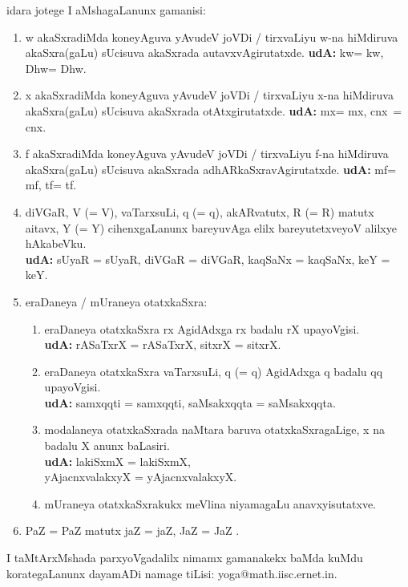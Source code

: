 \documentclass[12pt]{article}
\begin{document}
\bigskip
idara jotege I
aMshagaLanunx gamanisi:
\begin{enumerate}
\renewcommand{\labelenumi}{\theenumi)}
\item 
{\rm w} akaSxradiMda
koneyAguva yAvudeV joVDi / tirxvaLiyu {\rm w}-na hiMdiruva akaSxra(gaLu)
\hbox{sUcisuva} akaSxrada autavxvAgirutatxde. 
{\bf udA:} {\rm kw}= kw, {\rm Dhw}= Dhw.
\item
{\rm x} akaSxradiMda koneyAguva yAvudeV joVDi / tirxvaLiyu {\rm x}-na
hiMdiruva akaSxra(gaLu) sUcisuva akaSxrada otAtxgirutatxde. 
{\bf udA:} {\rm mx}=
\kern3pt\hbox{mx}, {\rm cnx}~=~
\kern3pt\hbox{cnx}. 

\item 
{\rm f} akaSxradiMda
koneyAguva yAvudeV joVDi / tirxvaLiyu {\rm f}-na hiMdiruva akaSxra(gaLu)
sUcisuva akaSxrada adhAR\-kaSxravAgirutatxde. 
{\bf udA:} {\rm mf}= mf, {\rm tf}= tf.
\item
diVGaR, V (= {\rm V}), vaTarxsuLi, \hbox{q} (= {\rm q}),
akARvatutx, R (= {\rm R}) matutx aitavx, \hbox{Y} (= {\rm Y})
cihenxgaLanunx bareyuvAga elilx bareyu\-tetxveyoV alilxye hAkabeVku. \\
{\bf udA:} {\rm sUyaR} = sUyaR, {\rm diVGaR} = diVGaR, {\rm kaqSaNx} = kaqSaNx, {\rm keY} =
keY.
\item
eraDaneya / mUraneya otatxkaSxra: 
\begin{enumerate}
\item
eraDaneya otatxkaSxra \kern4pt\hbox{rx} AgidAdxga {\rm rx} badalu
{\rm rX} upayoVgisi.\\ 
{\bf udA:} rASaTxrX = {\rm rASaTxrX}, sitxrX = {\rm sitxrX}.
\item
eraDaneya otatxkaSxra vaTarxsuLi, \hbox{q} (= {\rm q}) AgidAdxga
{\rm q} badalu {\rm qq} upayoVgisi.\\ 
{\bf udA:} samxqqti = {\rm samxqqti}, saMsakxqqta = {\rm saMsakxqqta}. 
\item
modalaneya otatxkaSxrada naMtara baruva otatxkaSxragaLige, {\rm x} na badalu
{\rm X} anunx baLasiri.\\
{\bf udA:} lakiSxmX = {\rm lakiSxmX},\\
\phantom{udA:} yAjacnxvalakxyX = {\rm yAjacnxvalakxyX}.
\item%
mUraneya  otatxkaSxrakukx meVlina niyamagaLu anavxyisutatxve.\\
\end{enumerate}
\item
PaZ = {\rm PaZ} matutx jaZ = {\rm jaZ}, JaZ = {\rm JaZ} .

\end{enumerate}

\medskip
I taMtArxMshada parxyoVgadalilx nimamx gamanakekx baMda kuMdu korategaLanunx
dayamADi namage tiLisi: {\rm yoga@math.iisc.ernet.in}.

\vfil
\noindent
{}
\end{document}
